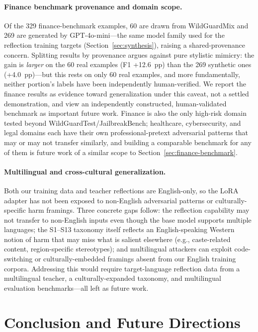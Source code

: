 \documentclass[superintelligence,article,submit,pdftex,moreauthors]{Definitions/mdpi}
\begin{document}
\paragraph{Finance benchmark provenance and domain scope.}
Of the 329 finance-benchmark examples, 60 are drawn from WildGuardMix and 269 are generated by GPT-4o-mini---the same model family used for the reflection training targets (Section~\ref{sec:synthesis}), raising a shared-provenance concern. Splitting results by provenance argues against pure stylistic mimicry: the gain is \emph{larger} on the 60 real examples (F1 +12.6~pp) than the 269 synthetic ones (+4.0~pp)---but this rests on only 60 real examples, and more fundamentally, neither portion's labels have been independently human-verified. We report the finance results as evidence toward generalization under this caveat, not a settled demonstration, and view an independently constructed, human-validated benchmark as important future work. Finance is also the only high-risk domain tested beyond WildGuardTest/JailbreakBench; healthcare, cybersecurity, and legal domains each have their own professional-pretext adversarial patterns that may or may not transfer similarly, and building a comparable benchmark for any of them is future work of a similar scope to Section~\ref{sec:finance-benchmark}.

\paragraph{Multilingual and cross-cultural generalization.}
Both our training data and teacher reflections are English-only, so the LoRA adapter has not been exposed to non-English adversarial patterns or culturally-specific harm framings. Three concrete gaps follow: the reflection capability may not transfer to non-English inputs even though the base model supports multiple languages; the S1--S13 taxonomy itself reflects an English-speaking Western notion of harm that may miss what is salient elsewhere (e.g., caste-related content, region-specific stereotypes); and multilingual attackers can exploit code-switching or culturally-embedded framings absent from our English training corpora. Addressing this would require target-language reflection data from a multilingual teacher, a culturally-expanded taxonomy, and multilingual evaluation benchmarks---all left as future work.

\section{Conclusion and Future Directions}
\end{document}
